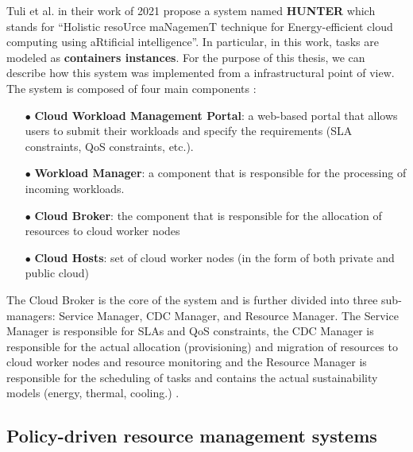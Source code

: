 Tuli et al. in their work of 2021 \cite{TULI2022111124} propose a system named \textbf{HUNTER} which stands for ``Holistic resoUrce
maNagemenT technique for Energy-efficient cloud computing using aRtificial intelligence''. 
In particular, in this work, tasks are modeled as \textbf{containers instances}.
For the purpose of this thesis, we can describe how this system was implemented from a infrastructural point of view.
The system is composed of four main components \cite{TULI2022111124}:
\begin{itemize}[itemsep=0.2pt, topsep=1pt]
    \item[$\bullet$] \textbf{Cloud Workload Management Portal}: a web-based portal that allows users to submit their workloads and specify the requirements (SLA constraints, QoS constraints, etc.).
    \item[$\bullet$] \textbf{Workload Manager}: a component that is responsible for the processing of incoming workloads.
    \item[$\bullet$] \textbf{Cloud Broker}:  the component that is responsible for the allocation of resources to cloud worker nodes
    \item[$\bullet$] \textbf{Cloud Hosts}: set of cloud worker nodes (in the form of both private and public cloud)
\end{itemize}
The Cloud Broker is the core of the system and is further divided into three sub-managers: Service Manager, CDC Manager, and Resource Manager.
The Service Manager is responsible for SLAs and QoS constraints, the CDC Manager is responsible for the actual allocation (provisioning) and migration of resources to cloud worker nodes and resource monitoring and the Resource Manager is responsible for the scheduling of tasks and contains the actual sustainability models (energy, thermal, cooling.) \cite{TULI2022111124}.

\subsection{Policy-driven resource management systems}

